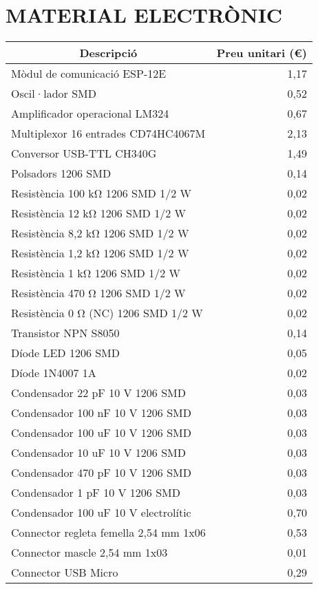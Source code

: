 
\section{\uppercase{Material electrònic}}

\begin{table}[H]
  \begin{center}
    \begin{tabularx} {\textwidth} {|X|r|} \hline
  \multicolumn{1}{|c|}{Descripció} &  \multicolumn{1}{c|}{Preu unitari (€)}\\ \hline \hline

    Mòdul de comunicació ESP-12E & 1,17 \\ \hline
    Oscil·lador SMD & 0,52 \\ \hline
    Amplificador operacional LM324 & 0,67 \\ \hline
    Multiplexor 16 entrades CD74HC4067M & 2,13 \\ \hline
    Conversor USB-TTL CH340G & 1,49 \\ \hline
    Polsadors 1206 SMD & 0,14 \\ \hline
    Resistència 100 k\si{\ohm} 1206 SMD 1/2 W & 0,02 \\ \hline
    Resistència 12 k\si{\ohm} 1206 SMD 1/2 W & 0,02 \\ \hline
    Resistència 8,2 k\si{\ohm} 1206 SMD 1/2 W & 0,02 \\ \hline
    Resistència 1,2 k\si{\ohm} 1206 SMD 1/2 W & 0,02 \\ \hline
    Resistència 1 k\si{\ohm} 1206 SMD 1/2 W & 0,02 \\ \hline
    Resistència 470 \si{\ohm} 1206 SMD 1/2 W & 0,02 \\ \hline
    Resistència 0 \si{\ohm} (NC) 1206 SMD 1/2 W & 0,02 \\ \hline
    Transistor NPN S8050 & 0,14 \\ \hline
    Díode LED 1206 SMD & 0,05 \\ \hline
    Díode 1N4007 1A & 0,02 \\ \hline
    Condensador 22 pF 10 V 1206 SMD & 0,03 \\ \hline
    Condensador 100 nF 10 V 1206 SMD & 0,03 \\ \hline
    Condensador 100 uF 10 V 1206 SMD & 0,03 \\ \hline
    Condensador 10 uF 10 V 1206 SMD & 0,03 \\ \hline
    Condensador 470 pF 10 V 1206 SMD & 0,03 \\ \hline
    Condensador 1 pF 10 V 1206 SMD & 0,03 \\ \hline
    Condensador 100 uF 10 V electrolític & 0,70 \\ \hline
    Connector regleta femella 2,54 mm 1x06 & 0,53 \\ \hline
    Connector mascle 2,54 mm 1x03 & 0,01 \\ \hline
    Connector USB Micro & 0,29 \\ \hline
    

\end{tabularx}
\end{center}
\end{table}
